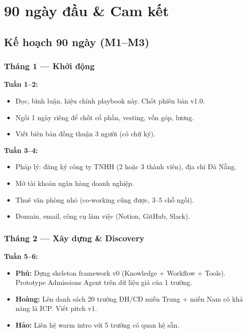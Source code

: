 \documentclass[11pt,a4paper]{article}
\begin{document}
\clearpage

\section{90 ngày đầu \& Cam kết}

\subsection{Kế hoạch 90 ngày (M1--M3)}

\subsubsection*{Tháng 1 --- Khởi động}

\textbf{Tuần 1--2:}
\begin{itemize}
\item Đọc, bình luận, hiệu chỉnh playbook này. Chốt phiên bản v1.0.
\item Ngồi 1 ngày riêng để chốt cổ phần, vesting, vốn góp, lương.
\item Viết biên bản đồng thuận 3 người (có chữ ký).
\end{itemize}

\textbf{Tuần 3--4:}
\begin{itemize}
\item Pháp lý: đăng ký công ty TNHH (2 hoặc 3 thành viên), địa chỉ Đà Nẵng.
\item Mở tài khoản ngân hàng doanh nghiệp.
\item Thuê văn phòng nhỏ (co-working cũng được, 3--5 chỗ ngồi).
\item Domain, email, công cụ làm việc (Notion, GitHub, Slack).
\end{itemize}

\subsubsection*{Tháng 2 --- Xây dựng \& Discovery}

\textbf{Tuần 5--6:}
\begin{itemize}
\item \textbf{Phú:} Dựng skeleton framework v0 (Knowledge + Workflow + Tools).
Prototype Admissions Agent trên dữ liệu giả của 1 trường.
\item \textbf{Hoàng:} Lên danh sách 20 trường ĐH/CĐ miền Trung + miền Nam có
khả năng là ICP. Viết pitch v1.
\item \textbf{Hảo:} Liên hệ warm intro với 5 trường có quan hệ sẵn.
\end{itemize}
\end{document}
